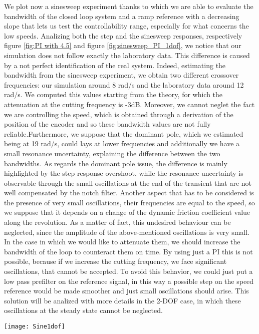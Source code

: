 We plot now a sinesweep experiment thanks to which we are able to evaluate the bandwidth of the closed loop system and a ramp reference with a decreasing slope that lets us test the controllability range, especially for what concerns the low speeds. 
Analizing both the step and the sinesweep responses, respectively figure \ref{fig:PI with 4.5} and figure \ref{fig:sinesweep_PI_1dof}, we notice that our simulation does not follow exactly the laboratory data. This difference is caused by a not perfect identification of the real system. Indeed, estimating the bandwidth from the sinesweep experiment, we obtain two different crossover frequencies: our simulation around 8 rad/s and the laboratory data around 12 rad/s. We computed this values starting from the theory, for which the attenuation at the cutting frequency is -3dB. Moreover, we cannot neglet the fact we are controlling the speed, which is obtained through a derivation of the position of the encoder and so these bandwidth values are not fully reliable.Furthermore, we suppose that the dominant pole, which we estimated being at 19 rad/s, could lays at lower frequencies and additionally we have a small resonance uncertainty, explaining the difference between the two bandwidths. As regards the dominant pole issue, the difference is mainly highlighted by the step response overshoot, while the resonance uncertainty is observable through the small oscillations at the end of the transient that are not well compensated by the notch filter.
Another aspect that has to be considered is the presence of very small oscillations, their frequencies are equal to the speed, so we suppose that it depends on a change of the dynamic friction coefficient value along the revolution. As a matter of fact, this undesired behaviour can be neglected, since the amplitude of the above-mentioned oscillations is very small. In the case in which we would like to attenuate them, we should increase the bandwidth of the loop to counteract them on time. By using just a PI this is not possible, because if we increase the cutting frequency, we face significant oscillations, that cannot be accepted. To avoid this behavior, we could just put a low pass prefilter on the reference signal, in this way a possible step on the speed reference would be made smoother and just small oscillations should arise. This solution will be analized with more details in the 2-DOF case, in which these oscillations at the steady state cannot be neglected.
\newpage
\begin{figure*}[h]
	\centering
	\texttt{[image: Sine1dof]}
	\caption{Sineweep experiment from 0.1 Hz to 10 Hz in 100s}
	\label{fig:sinesweep_PI_1dof}
\end{figure*}

